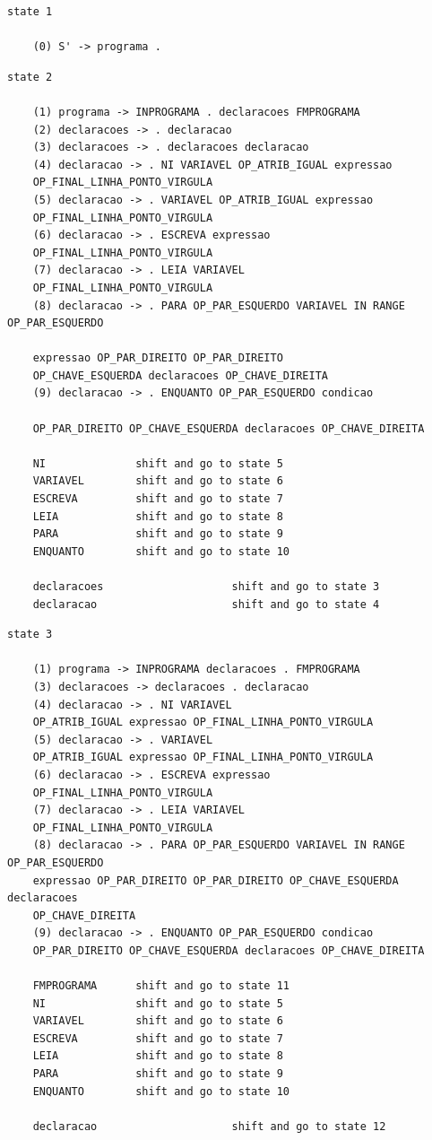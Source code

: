 \documentclass[a4paper,12pt]{article}
\begin{document}
\begin{verbatim} 
state 1

    (0) S' -> programa .

\end{verbatim}


\begin{verbatim}
state 2

    (1) programa -> INPROGRAMA . declaracoes FMPROGRAMA
    (2) declaracoes -> . declaracao
    (3) declaracoes -> . declaracoes declaracao
    (4) declaracao -> . NI VARIAVEL OP_ATRIB_IGUAL expressao 
    OP_FINAL_LINHA_PONTO_VIRGULA
    (5) declaracao -> . VARIAVEL OP_ATRIB_IGUAL expressao 
    OP_FINAL_LINHA_PONTO_VIRGULA
    (6) declaracao -> . ESCREVA expressao 
    OP_FINAL_LINHA_PONTO_VIRGULA
    (7) declaracao -> . LEIA VARIAVEL 
    OP_FINAL_LINHA_PONTO_VIRGULA
    (8) declaracao -> . PARA OP_PAR_ESQUERDO VARIAVEL IN RANGE OP_PAR_ESQUERDO 
    
    expressao OP_PAR_DIREITO OP_PAR_DIREITO 
    OP_CHAVE_ESQUERDA declaracoes OP_CHAVE_DIREITA
    (9) declaracao -> . ENQUANTO OP_PAR_ESQUERDO condicao 
    
    OP_PAR_DIREITO OP_CHAVE_ESQUERDA declaracoes OP_CHAVE_DIREITA

    NI              shift and go to state 5
    VARIAVEL        shift and go to state 6
    ESCREVA         shift and go to state 7
    LEIA            shift and go to state 8
    PARA            shift and go to state 9
    ENQUANTO        shift and go to state 10

    declaracoes                    shift and go to state 3
    declaracao                     shift and go to state 4

\end{verbatim}


\begin{verbatim}
state 3

    (1) programa -> INPROGRAMA declaracoes . FMPROGRAMA
    (3) declaracoes -> declaracoes . declaracao
    (4) declaracao -> . NI VARIAVEL 
    OP_ATRIB_IGUAL expressao OP_FINAL_LINHA_PONTO_VIRGULA
    (5) declaracao -> . VARIAVEL 
    OP_ATRIB_IGUAL expressao OP_FINAL_LINHA_PONTO_VIRGULA
    (6) declaracao -> . ESCREVA expressao 
    OP_FINAL_LINHA_PONTO_VIRGULA
    (7) declaracao -> . LEIA VARIAVEL 
    OP_FINAL_LINHA_PONTO_VIRGULA
    (8) declaracao -> . PARA OP_PAR_ESQUERDO VARIAVEL IN RANGE OP_PAR_ESQUERDO 
    expressao OP_PAR_DIREITO OP_PAR_DIREITO OP_CHAVE_ESQUERDA declaracoes 
    OP_CHAVE_DIREITA
    (9) declaracao -> . ENQUANTO OP_PAR_ESQUERDO condicao 
    OP_PAR_DIREITO OP_CHAVE_ESQUERDA declaracoes OP_CHAVE_DIREITA

    FMPROGRAMA      shift and go to state 11
    NI              shift and go to state 5
    VARIAVEL        shift and go to state 6
    ESCREVA         shift and go to state 7
    LEIA            shift and go to state 8
    PARA            shift and go to state 9
    ENQUANTO        shift and go to state 10

    declaracao                     shift and go to state 12

\end{verbatim}
\end{document}
